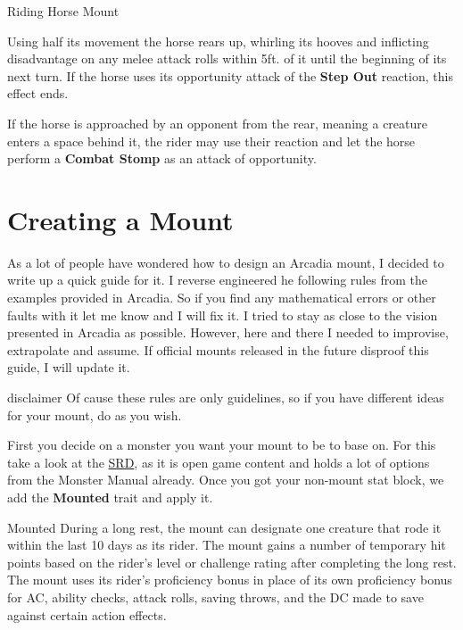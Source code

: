 \documentclass[letterpaper,twocolumn,openany,nodeprecatedcode]{dndbook}
\begin{document}
\begin{DndMonster}[float*=b,width=\textwidth + 8pt]{Riding Horse Mount}
\begin{multicols}{2}
    Using half its movement the horse rears up, whirling its hooves and inflicting disadvantage on any melee attack rolls within 5ft. of it until the beginning of its next turn. If the horse uses its opportunity attack of the \textbf{Step Out} reaction, this effect ends.


    If the horse is approached by an opponent from the rear, meaning a creature enters a space behind it, the rider may use their reaction and let the horse perform a \textbf{Combat Stomp} as an attack of opportunity.

  \end{multicols}
\end{DndMonster}

\chapter{Creating a Mount}

As a lot of people have wondered how to design an Arcadia mount, I decided to write up a quick guide for it.
I reverse engineered he following rules from the examples provided in Arcadia.
So if you find any mathematical errors or other faults with it let me know and I will fix it.
I tried to stay as close to the vision presented in Arcadia as possible.
However, here and there I needed to improvise, extrapolate and assume.
If official mounts released in the future disproof this guide, I will update it.

\begin{DndComment}{disclaimer}
  Of cause these rules are only guidelines, so if you have different ideas for your mount, do as you wish.
\end{DndComment}

First you decide on a monster you want your mount to be to base on.
For this take a look at the \href{https://dnd.wizards.com/articles/features/systems-reference-document-srd}{SRD}, as it is open game content and holds a lot of options from the Monster Manual already.
Once you got your non-mount stat block, we add the \textbf{Mounted} trait and apply it.

\begin{DndComment}{Mounted}
  During a long rest, the mount can designate one creature that rode it within the last 10 days as its rider. The mount gains a number of temporary hit points based on the rider’s level or challenge rating after completing the long rest. The mount uses its rider’s proficiency bonus in place of its own proficiency bonus for AC, ability checks, attack rolls, saving throws, and the DC made to save against certain action effects.
\end{DndComment}
\end{document}
